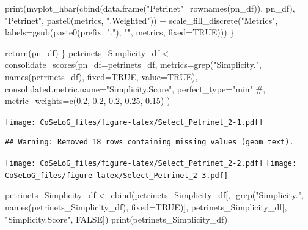 \documentclass[]{article}
\newenvironment{Shaded}{\begin{snugshade}}{\end{snugshade}}
\newcommand{\KeywordTok}[1]{\textcolor[rgb]{0.94,0.87,0.69}{{#1}}}
\newcommand{\DataTypeTok}[1]{\textcolor[rgb]{0.87,0.87,0.75}{{#1}}}
\newcommand{\StringTok}[1]{\textcolor[rgb]{0.80,0.58,0.58}{{#1}}}
\newcommand{\CommentTok}[1]{\textcolor[rgb]{0.50,0.62,0.50}{{#1}}}
\newcommand{\OtherTok}[1]{\textcolor[rgb]{0.94,0.94,0.56}{{#1}}}
\newcommand{\NormalTok}[1]{\textcolor[rgb]{0.80,0.80,0.80}{{#1}}}
\begin{document}
\begin{Shaded}
\begin{Highlighting}[]
        \KeywordTok{print}\NormalTok{(}\KeywordTok{myplot_hbar}\NormalTok{(}\KeywordTok{cbind}\NormalTok{(}\KeywordTok{data.frame}\NormalTok{(}\StringTok{"Petrinet"}\NormalTok{=}\KeywordTok{rownames}\NormalTok{(pn_df)),}
                                \NormalTok{pn_df), }
                          \StringTok{"Petrinet"}\NormalTok{, }\KeywordTok{paste0}\NormalTok{(metrics, }\StringTok{".Weighted"}\NormalTok{)) +}\StringTok{ }
\StringTok{            }\KeywordTok{scale_fill_discrete}\NormalTok{(}\StringTok{"Metrics"}\NormalTok{, }
                \DataTypeTok{labels=}\KeywordTok{gsub}\NormalTok{(}\KeywordTok{paste0}\NormalTok{(prefix, }\StringTok{"."}\NormalTok{), }\StringTok{""}\NormalTok{, metrics, }\DataTypeTok{fixed=}\OtherTok{TRUE}\NormalTok{)))}
    \NormalTok{\}}
    
    \KeywordTok{return}\NormalTok{(pn_df)}
\NormalTok{\}}
\NormalTok{petrinets_Simplicity_df <-}\StringTok{ }\KeywordTok{consolidate_scores}\NormalTok{(}\DataTypeTok{pn_df=}\NormalTok{petrinets_df, }
        \DataTypeTok{metrics=}\KeywordTok{grep}\NormalTok{(}\StringTok{"Simplicity."}\NormalTok{, }\KeywordTok{names}\NormalTok{(petrinets_df), }\DataTypeTok{fixed=}\OtherTok{TRUE}\NormalTok{, }\DataTypeTok{value=}\OtherTok{TRUE}\NormalTok{), }
        \DataTypeTok{consolidated.metric.name=}\StringTok{"Simplicity.Score"}\NormalTok{,}
        \DataTypeTok{perfect_type=}\StringTok{"min"}
        \CommentTok{#, metric_weights=c(0.2, 0.2, 0.2, 0.25, 0.15)}
        \NormalTok{)}
\end{Highlighting}
\end{Shaded}

\texttt{[image: CoSeLoG\_files/figure-latex/Select\_Petrinet\_2-1.pdf]}

\begin{verbatim}
## Warning: Removed 18 rows containing missing values (geom_text).
\end{verbatim}

\texttt{[image: CoSeLoG\_files/figure-latex/Select\_Petrinet\_2-2.pdf]}
\texttt{[image: CoSeLoG\_files/figure-latex/Select\_Petrinet\_2-3.pdf]}

\begin{Shaded}
\begin{Highlighting}[]
\NormalTok{petrinets_Simplicity_df <-}\StringTok{ }\KeywordTok{cbind}\NormalTok{(petrinets_Simplicity_df[, }
            \NormalTok{-}\KeywordTok{grep}\NormalTok{(}\StringTok{"Simplicity."}\NormalTok{, }\KeywordTok{names}\NormalTok{(petrinets_Simplicity_df), }\DataTypeTok{fixed=}\OtherTok{TRUE}\NormalTok{)],}
            \NormalTok{petrinets_Simplicity_df[, }\StringTok{"Simplicity.Score"}\NormalTok{, }\OtherTok{FALSE}\NormalTok{])}
\KeywordTok{print}\NormalTok{(petrinets_Simplicity_df)}
\end{Highlighting}
\end{Shaded}
\end{document}
